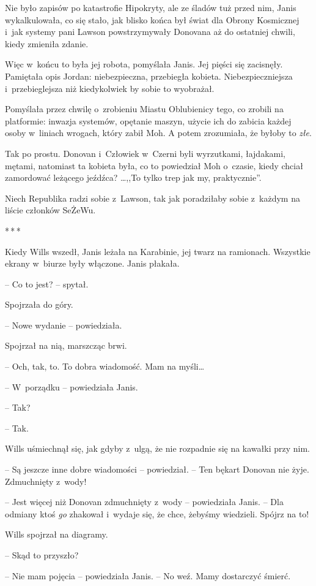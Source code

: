 \documentclass[oneside,polish,11pt,sfheadings]{mwbk}
\newcommand{\threeast}{\bigskip\par\centerline{*\,*\,*}\medskip\par}%
\begin{document}
Nie było zapisów po katastrofie Hipokryty, ale ze śladów tuż przed nim,
Janis wykalkulowała, co się stało, jak blisko końca był świat dla Obrony
Kosmicznej i~jak systemy pani Lawson powstrzymywały Donovana aż do
ostatniej chwili, kiedy zmieniła zdanie.

Więc w~końcu to była jej robota, pomyślała Janis. Jej pięści się
zacisnęły. Pamiętała opis Jordan: niebezpieczna, przebiegła kobieta.
Niebezpieczniejsza i~przebieglejsza niż kiedykolwiek by sobie to
wyobrażał.

Pomyślała przez chwilę o~zrobieniu Miastu Oblubienicy tego, co zrobili
na platformie: inwazja systemów, opętanie maszyn, użycie ich do zabicia
każdej osoby w~liniach wrogach, który zabił Moh. A potem zrozumiała, że
byłoby to \emph{złe}.

Tak po prostu. Donovan i~Człowiek w~Czerni byli wyrzutkami, łajdakami,
mętami, natomiast ta kobieta była, co to powiedział Moh o~czasie, kiedy
chciał zamordować leżącego jeźdźca? \ldots ,,To tylko trep jak my,
praktycznie''.

Niech Republika radzi sobie z~Lawson, tak jak poradziłaby sobie z~każdym
na liście członków SeŻeWu.
  \threeast 

Kiedy Wills wszedł, Janis leżała na Karabinie, jej twarz na ramionach.
Wszystkie ekrany w~biurze były włączone. Janis płakała.

-- Co to jest? -- spytał.

Spojrzała do góry.

-- Nowe wydanie -- powiedziała.

Spojrzał na nią, marszcząc brwi. 

-- Och, tak, to. To dobra wiadomość. Mam
na myśli\ldots

-- W~porządku -- powiedziała Janis.

-- Tak?

-- Tak.

Wills uśmiechnął się, jak gdyby z~ulgą, że nie rozpadnie się na kawałki
przy nim. 

-- Są jeszcze inne dobre wiadomości -- powiedział. -- Ten bękart
Donovan nie żyje. Zdmuchnięty z~wody!

-- Jest więcej niż Donovan zdmuchnięty z~wody -- powiedziała Janis. -- Dla
odmiany ktoś \emph{go} zhakował i~wydaje się, że chce, żebyśmy
wiedzieli. Spójrz na to!

Wills spojrzał na diagramy.

-- Skąd to przyszło?

-- Nie mam pojęcia -- powiedziała Janis. -- No weź. Mamy dostarczyć śmierć.
\end{document}
